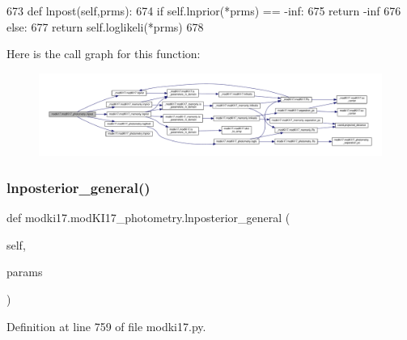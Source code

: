 \begin{DoxyCode}
673     \textcolor{keyword}{def }lnpost(self,prms):
674         \textcolor{keywordflow}{if} self.lnprior(*prms) == -inf:
675             \textcolor{keywordflow}{return} -inf
676         \textcolor{keywordflow}{else}:
677             \textcolor{keywordflow}{return} self.loglikeli(*prms)
678     
\end{DoxyCode}
Here is the call graph for this function\+:\nopagebreak
\begin{figure}[H]
\begin{center}
\leavevmode
\includegraphics[width=350pt]{dd/db2/classmodki17_1_1modKI17__photometry_a9686c3f863cf13041edca94fbf62a157_cgraph}
\end{center}
\end{figure}
\mbox{\label{classmodki17_1_1modKI17__photometry_ad1288aa45a1823113ff486133a5f7fa9}} 
\subsubsection{\texorpdfstring{lnposterior\+\_\+general()}{lnposterior\_general()}}
{\footnotesize\ttfamily def modki17.\+mod\+K\+I17\+\_\+photometry.\+lnposterior\+\_\+general (\begin{DoxyParamCaption}\item[{}]{self,  }\item[{}]{params }\end{DoxyParamCaption})}



Definition at line 759 of file modki17.\+py.


